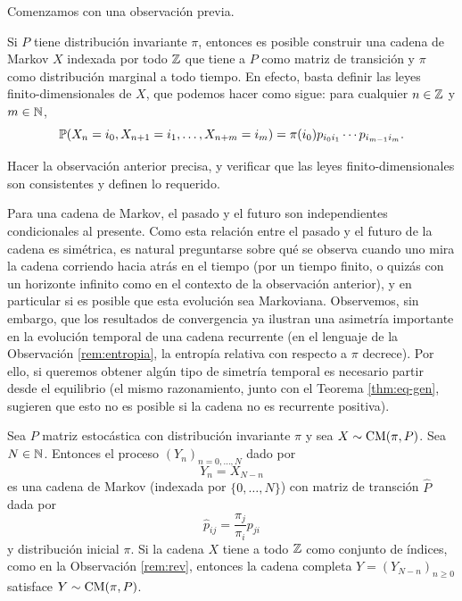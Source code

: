 Comenzamos con una observación previa.

\begin{rem}\label{rem:rev}
Si $P$ tiene distribución invariante $\pi$, entonces es posible construir una cadena de Markov $X$ indexada por todo $\mathbb{Z}$ que tiene a $P$ como matriz de transición y $\pi$ como distribución marginal a todo tiempo.
En efecto, basta definir las leyes finito-dimensionales de $X$, que podemos hacer como sigue: para cualquier $n\in\mathbb{Z}$ y $m\in\mathbb{N}$,
\[\mathbb{P}(X_n=i_0,X_{n+1}=i_1,\dotsc,X_{n+m}=i_m)=\pi(i_0)p_{i_0i_1}\dotsm p_{i_{m-1}i_m}.\]
\end{rem}

\begin{exer}
Hacer la observación anterior precisa, y verificar que las leyes finito-dimensionales son consistentes y definen lo requerido.
\end{exer}

Para una cadena de Markov, el pasado y el futuro son independientes condicionales al presente.
Como esta relación entre el pasado y el futuro de la cadena es simétrica, es natural preguntarse sobre qué se observa cuando uno mira la cadena corriendo hacia atrás en el tiempo (por un tiempo finito, o quizás con un horizonte infinito como en el contexto de la observación anterior), y en particular si es posible que esta evolución sea Markoviana.
Observemos, sin embargo, que los resultados de convergencia ya ilustran una asimetría importante en la evolución temporal de una cadena recurrente (en el lenguaje de la Observación \ref{rem:entropia}, la entropía relativa con respecto a $\pi$ decrece).
Por ello, si queremos obtener algún tipo de simetría temporal es necesario partir desde el equilibrio (el mismo razonamiento, junto con el Teorema \ref{thm:eq-gen}, sugieren que esto no es posible si la cadena no es recurrente positiva).

\begin{thm}\label{thm:rev}
Sea $P$ matriz estocástica con distribución invariante $\pi$ y sea $X\sim\text{\upshape{CM}}(\pi,P)$.
Sea $N\in\mathbb{N}$.
Entonces el proceso $(Y_n)_{n=0,\dotsc,N}$ dado por
\[Y_n=X_{N-n}\]
es una cadena de Markov (indexada por $\{0,\dotsc,N\}$) con matriz de transción $\hat P$ dada por
\[\hat p_{ij}=\frac{\pi_j}{\pi_i}p_{ji}\]
y distribución inicial $\pi$.
Si la cadena $X$ tiene a todo $\mathbb{Z}$ como conjunto de índices, como en la Observación \ref{rem:rev}, entonces la cadena completa $Y=(Y_{N-n})_{n\geq0}$ satisface $Y\sim\text{\upshape{CM}}(\pi,P)$.
\end{thm}

